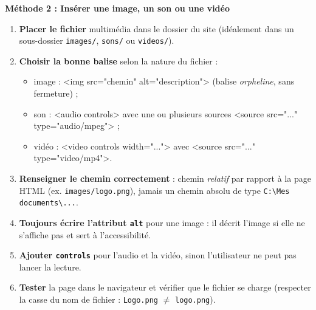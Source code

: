 \documentclass[11pt]{article}
\newcommand{\cle}[1]{{\popxbold\color{popdark}#1}}
\begin{document}
\textbf{Méthode 2 : Insérer une image, un son ou une vidéo}\par
\begin{methode}
\begin{enumerate}
\item \textbf{Placer le fichier} multimédia dans le dossier du site (idéalement dans un sous-dossier \texttt{images/}, \texttt{sons/} ou \texttt{videos/}).
\item \textbf{Choisir la bonne balise} selon la nature du fichier :
\begin{itemize}
\item image : \cle{<img src="chemin" alt="description">} (balise \emph{orpheline}, sans fermeture) ;
\item son : \cle{<audio controls>} avec une ou plusieurs sources \cle{<source src="..." type="audio/mpeg">} ;
\item vidéo : \cle{<video controls width="...">} avec \cle{<source src="..." type="video/mp4">}.
\end{itemize}
\item \textbf{Renseigner le chemin correctement} : chemin \emph{relatif} par rapport à la page HTML (ex. \texttt{images/logo.png}), jamais un chemin absolu de type \texttt{C:\textbackslash Mes documents\textbackslash ...}.
\item \textbf{Toujours écrire l'attribut \texttt{alt}} pour une image : il décrit l'image si elle ne s'affiche pas et sert à l'accessibilité.
\item \textbf{Ajouter \texttt{controls}} pour l'audio et la vidéo, sinon l'utilisateur ne peut pas lancer la lecture.
\item \textbf{Tester} la page dans le navigateur et vérifier que le fichier se charge (respecter la casse du nom de fichier : \texttt{Logo.png} $\neq$ \texttt{logo.png}).
\end{enumerate}
\end{methode}
\end{document}
